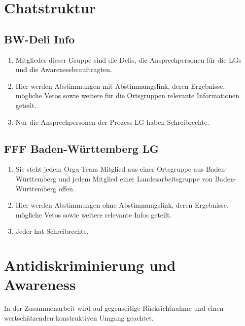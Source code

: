 \documentclass[a4paper,
  ]{scrartcl}
\begin{document}
\section{Chatstruktur}
\subsection{BW-Deli Info}
\begin{enumerate}
      \item Mitglieder dieser Gruppe sind die Delis, die Ansprechpersonen für die LGs und die Awarenessbeauftragten.
      \item Hier werden Abstimmungen mit Abstimmungslink, deren Ergebnisse, mögliche Vetos sowie
            weitere für die Ortsgruppen relevante Informationen geteilt.
      \item Nur die Ansprechpersonen der Prozess-LG haben Schreibrechte.
\end{enumerate}
\subsection{FFF Baden-Württemberg LG}
\begin{enumerate}
      \item Sie steht jedem Orga-Team Mitglied aus einer Ortsgruppe aus Baden-Württemberg und jedem
            Mitglied einer Landesarbeitsgruppe von Baden-Württemberg offen.
      \item Hier werden Abstimmungen ohne Abstimmungslink, deren Ergebnisse, mögliche Vetos sowie
            weitere relevante Infos geteilt.
      \item Jeder hat Schreibrechte.
\end{enumerate}
\section{Antidiskriminierung und Awareness}
In der Zusammenarbeit wird auf gegenseitige Rücksichtnahme und einen wertschätzenden konstruktiven
Umgang geachtet.
\end{document}
